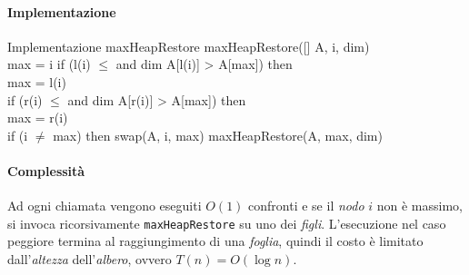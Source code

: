 \paragraph{Implementazione}
\begin{minicode}{Implementazione maxHeapRestore}
    \ind maxHeapRestore([] A,  i,  dim)\\
         max = i\hfill{}
        \indf if (l(i) $\leq$ and dim A[l(i)] > A[max]) then\\
            max = l(i)\\
        \indf if (r(i) $\leq$ and dim A[r(i)] > A[max]) then\\
            max = r(i)\\
        \indf if (i $\neq$ max) then\hfill{}
            swap(A, i, max)\hfill{}
            maxHeapRestore(A, max, dim)\hfill{}
\end{minicode}
\paragraph{Complessità}
Ad ogni chiamata vengono eseguiti $O(1)$ confronti e se il \emph{nodo} $i$ non è
massimo, si invoca ricorsivamente \texttt{maxHeapRestore} su uno dei \emph{figli}.
L'esecuzione nel caso peggiore termina al raggiungimento di una \emph{foglia},
quindi il costo è limitato dall'\emph{altezza} dell'\emph{albero}, ovvero
$T(n)=O(\log n)$.

